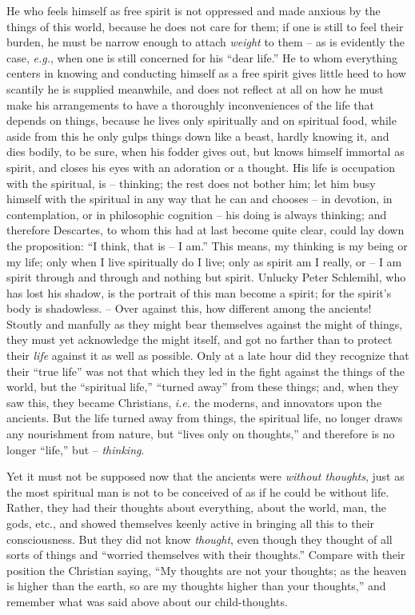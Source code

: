 \documentclass[12pt,a4paper]{book}
\begin{document}
He who feels himself as free spirit is not oppressed and made anxious by the 
things of this world, because he does not care for them; if one is still to 
feel their burden, he must be narrow enough to attach \textit{weight} to them 
-- as is evidently the case, \textit{e.g.}, when one is still concerned for 
his ``dear life.'' He to whom everything centers in knowing and conducting 
himself as a free spirit gives little heed to how scantily he is supplied 
meanwhile, and does not reflect at all on how he must make his arrangements to 
have a thoroughly inconveniences of the life that depends on things, because 
he lives only spiritually and on spiritual food, while aside from this he only 
gulps things down like a beast, hardly knowing it, and dies bodily, to be 
sure, when his fodder gives out, but knows himself immortal as spirit, and 
closes his eyes with an adoration or a thought. His life is occupation with 
the spiritual, is -- thinking; the rest does not bother him; let him busy 
himself with the spiritual in any way that he can and chooses -- in devotion, 
in contemplation, or in philosophic cognition -- his doing is always thinking; 
and therefore Descartes, to whom this had at last become quite clear, could 
lay down the proposition: ``I think, that is -- I am.'' This means, my 
thinking is my being or my life; only when I live spiritually do I live; only 
as spirit am I really, or -- I am spirit through and through and nothing but 
spirit. Unlucky Peter Schlemihl, who has lost his shadow, is the portrait of 
this man become a spirit; for the spirit's body is shadowless. -- Over against 
this, how different among the ancients! Stoutly and manfully as they might 
bear themselves against the might of things, they must yet acknowledge the 
might itself, and got no farther than to protect their \textit{life} against 
it as well as possible. Only at a late hour did they recognize that their 
``true life'' was not that which they led in the fight against the things of 
the world, but the ``spiritual life,'' ``turned away'' from these things; 
and, when they saw this, they became Christians, \textit{i.e.} the moderns, 
and innovators upon the ancients. But the life turned away from things, the 
spiritual life, no longer draws any nourishment from nature, but ``lives only 
on thoughts,'' and therefore is no longer ``life,'' but -- 
\textit{thinking}.

Yet it must not be supposed now that the ancients were \textit{without 
thoughts}, just as the most spiritual man is not to be conceived of as if he 
could be without life. Rather, they had their thoughts about everything, about 
the world, man, the gods, etc., and showed themselves keenly active in 
bringing all this to their consciousness. But they did not know 
\textit{thought}, even though they thought of all sorts of things and 
``worried themselves with their thoughts.'' Compare with their position the 
Christian saying, ``My thoughts are not your thoughts; as the heaven is 
higher than the earth, so are my thoughts higher than your thoughts,'' and 
remember what was said above about our child-thoughts.
\end{document}
